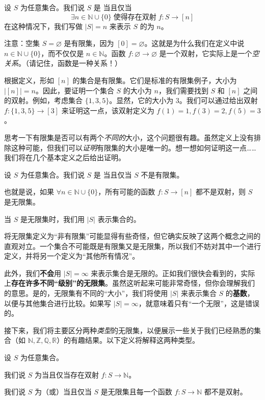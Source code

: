 \begin{definition}
    设 $S$ 为任意集合。我们说 $S$ 是 当且仅当
    \[\exists n \in \mathbb{N} \cup \{0\} \;\text{使得存在双射}\; f : S \to [n]\]
    在这种情况下，我们写做 $|S| = n$ 来表示 $S$ 的为 $n$。
\end{definition}

注意：空集 $S = \varnothing$ 是有限集，因为 $[0] = \varnothing$。这就是为什么我们在定义中说 $n \in \mathbb{N} \cup \{0\}$，而不仅仅是 $n \in \mathbb{N}$。函数 $f : \varnothing \to \varnothing$ 是一个双射，它实际上是一个\emph{空关系}。（请记住，函数是一种关系！）

根据定义，形如 $[n]$ 的集合是有限集。它们是标准的有限集例子，大小为 $|[n]| = n$。因此，要证明一个集合 $S$ 的大小为 $n$，我们需要找到 $S$ 和 $[n]$ 之间的双射。例如，考虑集合 $\{1, 3, 5\}$。显然，它的大小为 $3$。我们可以通过给出双射 $f : \{1, 3, 5\} \to [3]$ 来证明这一点，该双射定义为 $f(1) = 1, f(3) = 2, f(5) = 3$。

思考一下有限集是否可以有两个\emph{不同的}大小，这个问题很有趣。虽然定义上没有排除这种可能，但我们可以\emph{证明}有限集的大小是唯一的。想一想如何证明这一点……我们将在几个基本定义之后给出证明。

\begin{definition}
    设 $S$ 为任意集合。我们说 $S$ 是 当且仅当 $S$ 不是有限集。

    也就是说，如果 $\forall n \in \mathbb{N} \cup \{0\}$，所有可能的函数 $f : S \to [n]$ 都不是双射，则 $S$ 是无限集。

    当 $S$ 是无限集时，我们用 $|S|$ 表示集合的。
\end{definition}

将无限集定义为``非有限集''可能显得有些奇怪，但它确实反映了这两个概念之间的直观对立。一个集合不可能既是有限集又是无限集，所以我们不妨对其中一个进行定义，并将另一个定义为``其他所有情况''。

此外，我们\textbf{不会}用 $|S| = \infty$ 来表示集合是无限的。正如我们很快会看到的，实际上\textbf{存在许多不同``级别''的无限集}。虽然这听起来可能非常奇怪，但你会理解我们的意思。是的，无限集有不同的``大小''，我们将使用 $|S|$ 来表示集合 $S$ 的\textbf{基数}，以便与其他集合进行比较。如果写 $|S| = \infty$，就意味着只有``一个无限''，这是错误的。

接下来，我们将主要区分两种\emph{类型}的无限集，以便展示一些关于我们已经熟悉的集合（如 $\mathbb{N}, \mathbb{Z}, \mathbb{Q}, \mathbb{R}$）的有趣结果。以下定义将解释这两种类型。

\begin{definition}
    设 $S$ 为任意集合。

    我们说 $S$ 为当且仅当存在双射 $f : S \to \mathbb{N}$。

    我们说 $S$ 为（或）当且仅当 $S$ 是无限集且每一个函数 $f : S \to \mathbb{N}$ 都不是双射。
\end{definition}

